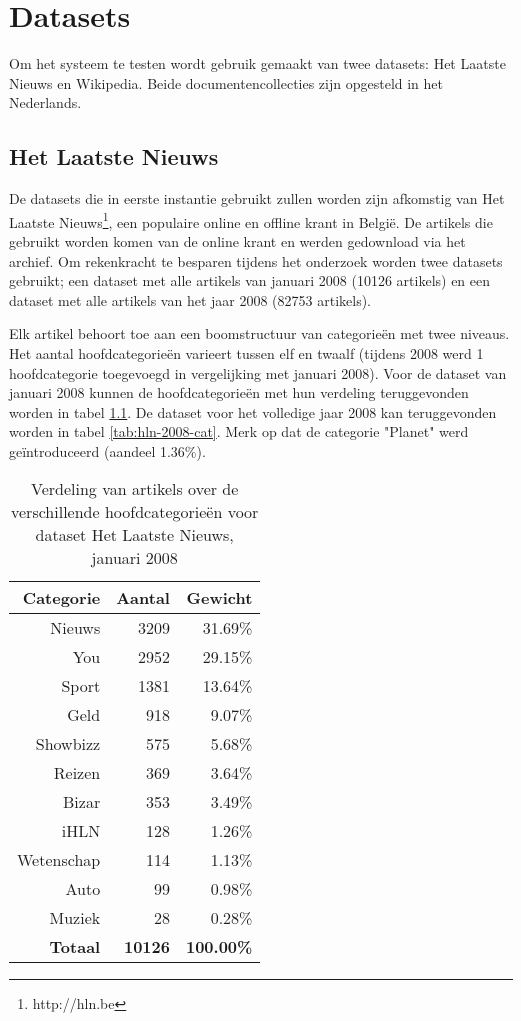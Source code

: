 \chapter{Datasets}
Om het systeem te testen wordt gebruik gemaakt van twee datasets: Het Laatste Nieuws en Wikipedia. Beide documentencollecties zijn opgesteld in het Nederlands.

\section{Het Laatste Nieuws}
De datasets die in eerste instantie gebruikt zullen worden zijn afkomstig van Het Laatste Nieuws\footnote{http://hln.be}, een populaire online en offline krant in Belgi\"e. De artikels die gebruikt worden komen van de online krant en werden gedownload via het archief. Om rekenkracht te besparen tijdens het onderzoek worden twee datasets gebruikt; een dataset met alle artikels van januari 2008 (10126 artikels) en een dataset met alle artikels van het jaar 2008 (82753 artikels).

Elk artikel behoort toe aan een boomstructuur van categorie\"en met twee niveaus. Het aantal hoofdcategorie\"en varieert tussen elf en twaalf (tijdens 2008 werd 1 hoofdcategorie toegevoegd in vergelijking met januari 2008). Voor de dataset van januari 2008 kunnen de hoofdcategorie\"en met hun verdeling teruggevonden worden in tabel \ref{tab:hln-2008-01-cat}. De dataset voor het volledige jaar 2008 kan teruggevonden worden in tabel \ref{tab:hln-2008-cat}. Merk op dat de categorie "Planet" werd ge\"introduceerd (aandeel 1.36\%).


\begin{table}[htbp]
	\centering
	\caption{Verdeling van artikels over de verschillende hoofdcategorie\"en voor dataset Het Laatste Nieuws, januari 2008}
	\begin{tabular}{rrr}
		\toprule
		Categorie & Aantal & Gewicht \\
		\midrule
		Nieuws & 3209  & 31.69\% \\
		You   & 2952  & 29.15\% \\
		Sport & 1381  & 13.64\% \\
		Geld  & 918   & 9.07\% \\
		Showbizz & 575   & 5.68\% \\
		Reizen & 369   & 3.64\% \\
		Bizar & 353   & 3.49\% \\
		iHLN  & 128   & 1.26\% \\
		Wetenschap & 114   & 1.13\% \\
		Auto  & 99    & 0.98\% \\
		Muziek & 28    & 0.28\% \\
		\textbf{Totaal} & \textbf{10126} &\textbf{ 100.00\%} \\
		\bottomrule
	\end{tabular}%
	\label{tab:hln-2008-01-cat}%
\end{table}%


